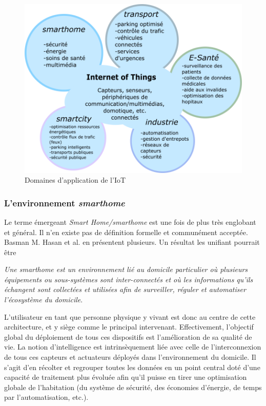 \documentclass[]{article}
\begin{document}
\begin{figure}[!h]
\centering
\includegraphics[width=0.65\linewidth]{IoT_domains.png}
\caption{Domaines d'application de l'IoT}
\label{domains_IoT}
\end{figure}

\newpage

\subsubsection{L'environnement \textit{smarthome}}
\label{smarthomearchi}
\par Le terme émergeant \textit{Smart Home/smarthome} est une fois de plus très englobant et général. Il n'en existe pas de définition formelle et communément acceptée. Basman M. Hasan et al. \cite{Basman2016} en présentent plusieurs. Un résultat les unifiant pourrait être
\begin{center}
 \textit{\og Une smarthome est un environnement lié au domicile particulier où plusieurs équipements ou sous-systèmes sont inter-connectés et où les informations qu'ils échangent sont collectées et utilisées afin de surveiller, réguler et automatiser l'écosystème du domicile\fg{}}.\\
\end{center}

\par L'utilisateur en tant que personne physique y vivant est donc au centre de cette architecture, et y siège comme le principal intervenant. Effectivement, l'objectif global du déploiement de tous ces dispositifs est l'amélioration de sa qualité de vie. La notion d'intelligence est intrinsèquement liée avec celle de l'interconnexion de tous ces capteurs et actuateurs déployés dans l'environnement du domicile. Il s'agit d'en récolter et regrouper toutes les données en un point central doté d'une capacité de traitement plus évoluée afin qu'il puisse en tirer une optimisation globale de l'habitation (du système de sécurité, des économies d'énergie, de temps par l'automatisation, etc.).\\
\end{document}
